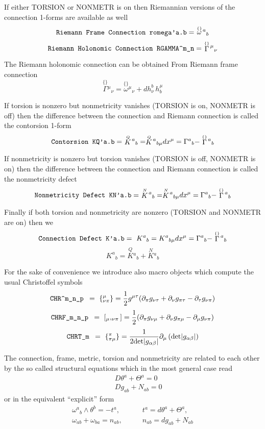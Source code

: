 \documentclass[twoside,openright]{report}
\newcommand{\grgtt}{\ttfamily}
\newcommand{\rim}[1]{\stackrel{\scriptscriptstyle\{\}}{#1}\!}
\newcommand{\object}[2]{%
\begin{equation}
\mbox{\comm{#1}} =\ #2
\end{equation}}
\renewcommand{\tt}{\grgtt}
\def\^{{\tt \char'136}}                     %
\def\_{{\tt \char'137}}                     %
\newcommand{\comm}[1]{{\upshape\tt#1}}    %
\begin{document}
If either \comm{TORSION} or \comm{NONMETR} is on then Riemannian
versions of the connection 1-forms are available as well
\object{Riemann Frame Connection romega'a.b}
{\rim{\omega}{}^a{}_b}
\object{Riemann Holonomic Connection RGAMMA\^m\_n}
{\rim{\Gamma}{}^\mu{}_\nu}

The Riemann holonomic connection can be obtained
{\tt From Riemann frame connection}
\begin{equation}
\rim{\Gamma}{}^\mu{}_\nu=\rim{\omega}{}^\mu{}_\nu + dh^b_\nu\,h^\mu_b
\end{equation}



If torsion is nonzero but nonmetricity vanishes
(\comm{TORSION} is on, \comm{NONMETR} is off) then
the difference between the connection and Riemann connection
is called the contorsion 1-form
\object{Contorsion KQ'a.b}{\stackrel{\scriptscriptstyle Q}{K}\!{}^a{}_b=
\stackrel{\scriptscriptstyle Q}{K}\!{}^a{}_{b\mu}dx^\mu=
\Gamma^a{}_b-\rim{\Gamma}{}^a{}_b}

If nonmetricity is nonzero but torsion vanishes
(\comm{TORSION} is off, \comm{NONMETR} is on) then
the difference between the connection and Riemann connection
is called the nonmetricity defect
\object{Nonmetricity Defect KN'a.b}
{\stackrel{\scriptscriptstyle N}{K}\!{}^a{}_b=
\stackrel{\scriptscriptstyle N}{K}\!{}^a{}_{b\mu}dx^\mu=
\Gamma^a{}_b-\rim{\Gamma}{}^a{}_b}

Finally if both torsion and nonmetricity are nonzero
(\comm{TORSION} and \comm{NONMETR} are on) then we
\object{Connection Defect K'a.b}
{K^a{}_b=K^a{}_{b\mu}dx^\mu=
\Gamma^a{}_b-\rim{\Gamma}{}^a{}_b}
\begin{equation}
K^a{}_b = \stackrel{\scriptscriptstyle Q}{K}\!{}^a{}_b
+ \stackrel{\scriptscriptstyle N}{K}\!{}^a{}_b
\end{equation}


For the sake of convenience we introduce also macro objects
which compute the usual Christoffel symbols
\object{CHR\^m\_n\_p  }{ \{{}^\mu_{\nu\pi}\} =
\frac{1}{2}g^{\mu\tau}(\partial_\pi g_{\nu\tau}
+\partial_\nu g_{\pi\tau}
-\partial_\tau g_{\nu\pi})}
\object{CHRF\_m\_n\_p }{ [{}_{\mu},_{\nu\pi}]  =
\frac{1}{2}(\partial_\pi g_{\nu\mu}
+\partial_\nu g_{\pi\mu}
-\partial_\mu g_{\nu\pi})}
\object{CHRT\_m }{ \{{}^\pi_{\pi\mu}\} =
\frac{1}{2{\rm det}|g_{\alpha\beta}|}\partial_\mu\left(
{\rm det}|g_{\alpha\beta}|\right)}

The connection, frame, metric, torsion and nonmetricity are
related to each other by the so called structural equations
which in the most general case read
\begin{eqnarray}
&& D\theta^a + \Theta^a = 0 \nonumber\\[2mm]
&& Dg_{ab} + N_{ab} = 0 \label{str0}
\end{eqnarray}
or in the equivalent ``explicit'' form
\begin{equation}
\begin{array}{ll}
\omega^a{}_b\wedge\theta^b = -t^a,\qquad & t^a=d\theta^a+\Theta^a,\\[2mm]
\omega_{ab}+\omega_{ba} = n_{ab},\qquad & n_{ab}=dg_{ab}+N_{ab} \label{str}
\end{array}
\end{equation}
\end{document}
